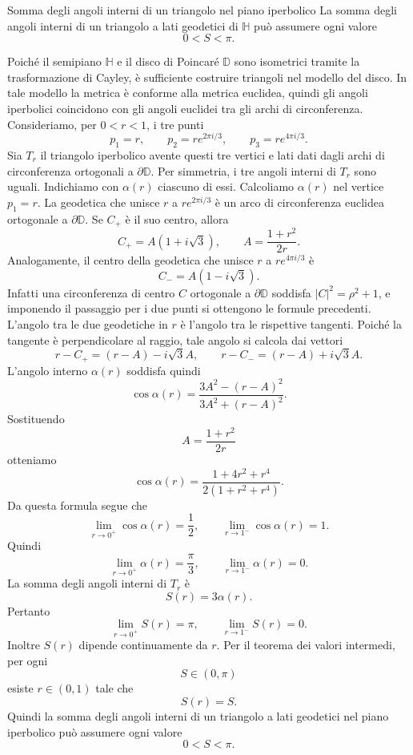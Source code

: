 \documentclass[a4paper]{article}
\begin{document}
\begin{snippetproposition}{Somma degli angoli interni di un triangolo nel piano iperbolico}
    La somma degli angoli interni di un triangolo a lati geodetici di \(\mathbb{H}\) può assumere ogni valore
    \[
        0<S<\pi.
    \]
\end{snippetproposition}

\begin{snippetproof}{}
    Poiché il semipiano \(\mathbb{H}\) e il disco di Poincaré \(\mathbb{D}\) sono isometrici tramite la trasformazione di Cayley, è sufficiente costruire triangoli nel modello del disco. In tale modello la metrica è conforme alla metrica euclidea, quindi gli angoli iperbolici coincidono con gli angoli euclidei tra gli archi di circonferenza.
    Consideriamo, per \(0<r<1\), i tre punti
    \[
        p_1=r,
        \qquad
        p_2=re^{2\pi i/3},
        \qquad
        p_3=re^{4\pi i/3}.
    \]
    Sia \(T_r\) il triangolo iperbolico avente questi tre vertici e lati dati dagli archi di circonferenza ortogonali a \(\partial\mathbb{D}\). Per simmetria, i tre angoli interni di \(T_r\) sono uguali. Indichiamo con \(\alpha(r)\) ciascuno di essi.
    Calcoliamo \(\alpha(r)\) nel vertice \(p_1=r\). La geodetica che unisce \(r\) a \(re^{2\pi i/3}\) è un arco di circonferenza euclidea ortogonale a \(\partial\mathbb{D}\). Se \(C_+\) è il suo centro, allora
    \[
        C_+=A(1+i\sqrt3),
        \qquad
        A=\frac{1+r^2}{2r}.
    \]
    Analogamente, il centro della geodetica che unisce \(r\) a \(re^{4\pi i/3}\) è
    \[
        C_-=A(1-i\sqrt3).
    \]
    Infatti una circonferenza di centro \(C\) ortogonale a \(\partial\mathbb{D}\) soddisfa \(|C|^2=\rho^2+1\), e imponendo il passaggio per i due punti si ottengono le formule precedenti.
    L'angolo tra le due geodetiche in \(r\) è l'angolo tra le rispettive tangenti. Poiché la tangente è perpendicolare al raggio, tale angolo si calcola dai vettori
    \[
        r-C_+=(r-A)-i\sqrt3A,
        \qquad
        r-C_-=(r-A)+i\sqrt3A.
    \]
    L'angolo interno \(\alpha(r)\) soddisfa quindi
    \[
        \cos\alpha(r)
        =
        \frac{3A^2-(r-A)^2}{3A^2+(r-A)^2}.
    \]
    Sostituendo
    \[
        A=\frac{1+r^2}{2r}
    \]
    otteniamo
    \[
        \cos\alpha(r)
        =
        \frac{1+4r^2+r^4}{2(1+r^2+r^4)}.
    \]
    Da questa formula segue che
    \[
        \lim_{r\to0^+}\cos\alpha(r)=\frac12,
        \qquad
        \lim_{r\to1^-}\cos\alpha(r)=1.
    \]
    Quindi
    \[
        \lim_{r\to0^+}\alpha(r)=\frac{\pi}{3},
        \qquad
        \lim_{r\to1^-}\alpha(r)=0.
    \]
    La somma degli angoli interni di \(T_r\) è
    \[
        S(r)=3\alpha(r).
    \]
    Pertanto
    \[
        \lim_{r\to0^+}S(r)=\pi,
        \qquad
        \lim_{r\to1^-}S(r)=0.
    \]
    Inoltre \(S(r)\) dipende continuamente da \(r\). Per il teorema dei valori intermedi, per ogni
    \[
        S\in(0,\pi)
    \]
    esiste \(r\in(0,1)\) tale che
    \[
        S(r)=S.
    \]
    Quindi la somma degli angoli interni di un triangolo a lati geodetici nel piano iperbolico può assumere ogni valore
    \[
        0<S<\pi.
    \]
\end{snippetproof}
\end{document}

